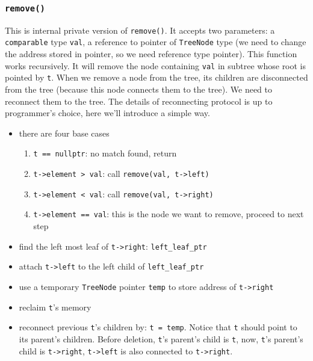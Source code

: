 \documentclass[11pt]{book}
\begin{document}
\subsubsection{\texttt{remove()}}
\label{sec:orga79c5d3}
This is internal private version of \texttt{remove()}. It accepts two parameters: a \texttt{comparable} type \texttt{val}, a reference to pointer of \texttt{TreeNode} type (we need to change the address stored in pointer, so we need reference type pointer). This function works recursively. It will remove the node containing \texttt{val} in subtree whose root is pointed by \texttt{t}. When we remove a node from the tree, its children are disconnected from the tree (because this node connects them to the tree). We need to reconnect them to the tree. The details of reconnecting protocol is up to programmer's choice, here we'll introduce a simple way.
\begin{itemize}
\item there are four base cases
\begin{enumerate}
\item \texttt{t == nullptr}: no match found, return
\item \texttt{t->element > val}: call \texttt{remove(val, t->left)}
\item \texttt{t->element < val}: call \texttt{remove(val, t->right)}
\item \texttt{t->element == val}: this is the node we want to remove, proceed to next step
\end{enumerate}
\item find the left most leaf of \texttt{t->right}: \texttt{left\_leaf\_ptr}
\item attach \texttt{t->left} to the left child of \texttt{left\_leaf\_ptr}
\item use a temporary \texttt{TreeNode} pointer \texttt{temp}  to store address of \texttt{t->right}
\item reclaim \texttt{t}'s memory
\item reconnect previous \texttt{t}'s children by: \texttt{t = temp}. Notice that \texttt{t} should point to its parent's children. Before deletion, \texttt{t}'s parent's child is \texttt{t}, now, \texttt{t}'s parent's child is \texttt{t->right}, \texttt{t->left} is also connected to \texttt{t->right}.
\end{itemize}
\end{document}
